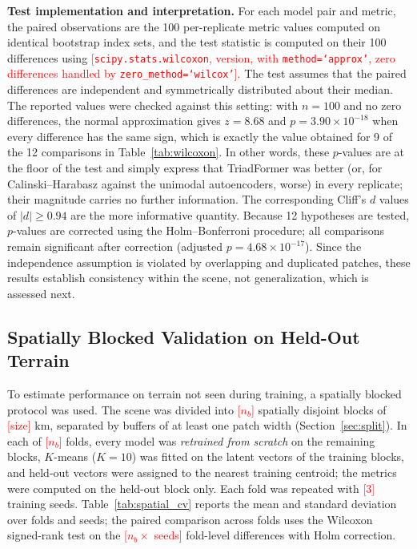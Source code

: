 \documentclass[pdflatex,sn-mathphys-num]{sn-jnl}
\newcommand{\fillin}[1]{\textcolor{red}{[#1]}}
\begin{document}
\textbf{Test implementation and interpretation.} For each model pair and metric, the paired observations are the 100 per-replicate metric values computed on identical bootstrap index sets, and the test statistic is computed on their 100 differences using \fillin{\texttt{scipy.stats.wilcoxon}, version, with \texttt{method=`approx'}, zero differences handled by \texttt{zero\_method=`wilcox'}}. The test assumes that the paired differences are independent and symmetrically distributed about their median. The reported values were checked against this setting: with $n=100$ and no zero differences, the normal approximation gives $z=8.68$ and $p=3.90\times10^{-18}$ when every difference has the same sign, which is exactly the value obtained for 9 of the 12 comparisons in Table~\ref{tab:wilcoxon}. In other words, these $p$-values are at the floor of the test and simply express that TriadFormer was better (or, for Calinski--Harabasz against the unimodal autoencoders, worse) in every replicate; their magnitude carries no further information. The corresponding Cliff's $d$ values of $|d|\geq0.94$ are the more informative quantity. Because 12 hypotheses are tested, $p$-values are corrected using the Holm--Bonferroni procedure; all comparisons remain significant after correction (adjusted $p=4.68\times10^{-17}$). Since the independence assumption is violated by overlapping and duplicated patches, these results establish consistency within the scene, not generalization, which is assessed next.

\subsection{Spatially Blocked Validation on Held-Out Terrain}
\label{sec:spatial_cv}

To estimate performance on terrain not seen during training, a spatially blocked protocol was used. The scene was divided into \fillin{$n_b$} spatially disjoint blocks of \fillin{size} km, separated by buffers of at least one patch width (Section~\ref{sec:split}). In each of \fillin{$n_b$} folds, every model was \emph{retrained from scratch} on the remaining blocks, $K$-means ($K=10$) was fitted on the latent vectors of the training blocks, and held-out vectors were assigned to the nearest training centroid; the metrics were computed on the held-out block only. Each fold was repeated with \fillin{3} training seeds. Table~\ref{tab:spatial_cv} reports the mean and standard deviation over folds and seeds; the paired comparison across folds uses the Wilcoxon signed-rank test on the \fillin{$n_b\times$ seeds} fold-level differences with Holm correction.
\end{document}
